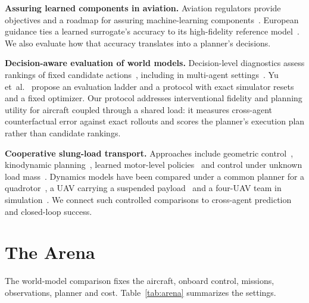 \documentclass[conference]{IEEEtran}
\begin{document}
\textbf{Assuring learned components in aviation.} Aviation regulators provide objectives and a roadmap for assuring machine-learning components~\cite{easa2024concept,faa2024roadmap}. European guidance ties a learned surrogate's accuracy to its high-fidelity reference model~\cite{easa2024concept}. We also evaluate how that accuracy translates into a planner's decisions.

\textbf{Decision-aware evaluation of world models.} Decision-level diagnostics assess rankings of fixed candidate actions~\cite{qiu2026adwm,liu2026predictionfidelity,rana2026auditing}, including in multi-agent settings~\cite{zou2026mawam}. Yu et~al.~\cite{yu2026position} propose an evaluation ladder and a protocol with exact simulator resets and a fixed optimizer. Our protocol addresses interventional fidelity and planning utility for aircraft coupled through a shared load: it measures cross-agent counterfactual error against exact rollouts and scores the planner's execution plan rather than candidate rankings.

\textbf{Cooperative slung-load transport.} Approaches include geometric control~\cite{lee2014geometric}, kinodynamic planning~\cite{wahba2024kinodynamic}, learned motor-level policies~\cite{lorentz2026crazymarl} and control under unknown load mass~\cite{sun2025agile,hajieghrary2026adaptive}. Dynamics models have been compared under a common planner for a quadrotor~\cite{min2026same}, a UAV carrying a suspended payload~\cite{belkhale2021meta,jin2025neural} and a four-UAV team in simulation~\cite{khursheed2024cooperative}. We connect such controlled comparisons to cross-agent prediction and closed-loop success.

\section{The Arena}\label{sec:arena}
The world-model comparison fixes the aircraft, onboard control, missions, observations, planner and cost. Table~\ref{tab:arena} summarizes the settings.
\end{document}
